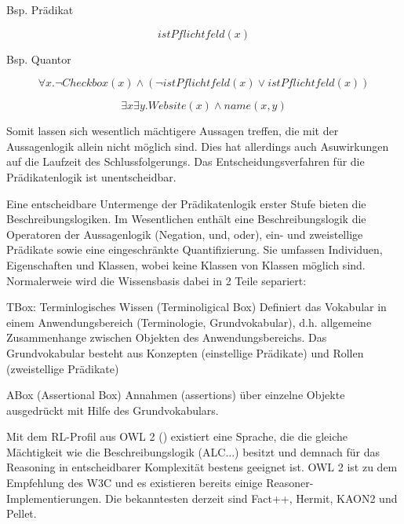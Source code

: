 \documentclass[runningheads,a4paper]{llncs}
\begin{document}
Bsp. Prädikat

\begin{equation}
istPflichtfeld(x)
\end{equation}

Bsp. Quantor

\begin{equation}
\forall x. \neg Checkbox(x) \land (\neg istPflichtfeld(x) \lor istPflichtfeld(x))
\end{equation}

\begin{equation}
\exists x\exists y. Website(x) \land name(x, y)
\end{equation}

Somit lassen sich wesentlich mächtigere Aussagen treffen, die mit der Aussagenlogik allein nicht möglich sind.
Dies hat allerdings auch Asuwirkungen auf die Laufzeit des Schlussfolgerungs.
Das Entscheidungsverfahren für die Prädikatenlogik ist unentscheidbar.

Eine entscheidbare Untermenge der Prädikatenlogik erster Stufe bieten die Beschreibungslogiken.
Im Wesentlichen enthält eine Beschreibungslogik die Operatoren der Aussagenlogik (Negation, und, oder), ein- und zweistellige Prädikate sowie eine eingeschränkte Quantifizierung.
Sie umfassen Individuen, Eigenschaften und Klassen, wobei keine Klassen von Klassen möglich sind.
Normalerweie wird die Wissensbasis dabei in 2 Teile separiert:

TBox: Terminlogisches Wissen (Terminoligical Box)
Definiert das Vokabular in einem Anwendungsbereich (Terminologie, Grundvokabular), d.h. allgemeine Zusammenhange zwischen Objekten des Anwendungsbereichs.
Das Grundvokabular besteht aus Konzepten (einstellige Prädikate) und Rollen (zweistellige Prädikate)

ABox (Assertional Box)
Annahmen (assertions) über einzelne Objekte ausgedrückt mit
Hilfe des Grundvokabulars.

Mit dem RL-Profil aus OWL 2 (\cite{owl2rl}) existiert eine Sprache, die die gleiche Mächtigkeit wie die Beschreibungslogik (ALC...) besitzt und demnach für das Reasoning in entscheidbarer Komplexität bestens geeignet ist. 
OWL 2 ist zu dem Empfehlung des W3C und es existieren bereits einige Reasoner-Implementierungen. 
Die bekanntesten derzeit sind Fact++, Hermit, KAON2 und Pellet.
\end{document}
